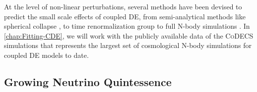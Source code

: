 At the level of non-linear perturbations, several methods have been
devised to predict the small scale effects of coupled DE, from semi-analytical
methods like spherical collapse \cite{Pace_Waizmann_Bartelmann_2010},
to time renormalization group \citep{Saracco_etal_2010} to full N-body
simulations \citep{Maccio_etal_2004,baldi_etal_2010,Li_Barrow_2011,Carlesi_etal_2014a}.
In \cref{chap:Fitting-CDE}, we will work with the publicly available data of
the \textsc{CoDECS} simulations \citep{baldi_codecs_2012}
that represents the largest set of cosmological N-body simulations
for coupled DE models to date.



\subsection{Growing Neutrino Quintessence \label{sub:GNQ}}

